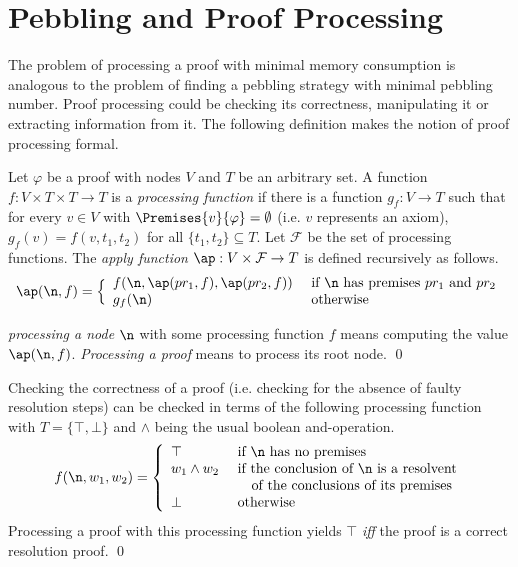 \section{Pebbling and Proof Processing}
\label{sec:pebblingchecking}

The problem of processing a proof with minimal memory consumption is analogous to the problem of finding a pebbling strategy with minimal pebbling number.
Proof processing could be checking its correctness, manipulating it or extracting information from it.
The following definition makes the notion of proof processing formal.

\begin{definition}
\label{def:proof-processing}

Let $\varphi$ be a proof with nodes $V$ and $T$ be an arbitrary set.
A function $f: V \times T \times T \rightarrow T$ is a \emph{processing function} if there is a function $g_f: V \rightarrow T$ such that for every $v \in V$ with $\Premises{v}{\varphi} = \emptyset$ (i.e. $v$ represents an axiom), $g_f(v) = f(v,t_1,t_2)$ for all $\{t_1,t_2\} \subseteq T$.
Let $\mathcal{F}$ be the set of processing functions.
The \emph{apply function} $\ap: V \times \mathcal{F} \rightarrow T$ is defined recursively as follows.
$$
\ap(\n,f) = \Big\{
\begin{array}{ll}
	f(\n,\ap(pr_1,f),\ap(pr_2,f)) &\text{ if } \n \text{ has premises } pr_1 \text{ and } pr_2\\
	g_f(\n) &\text{ otherwise}\\
\end{array}
$$

\emph{processing a node} $\n$ with some processing function $f$ means computing the value $\ap(\n,f)$.
\emph{Processing a proof} means to process its root node.
\qed
\end{definition}

\begin{example}

Checking the correctness of a proof (i.e. checking for the absence of faulty resolution steps) can be checked in terms of the following processing function with $T = \{\top,\bot\}$ and $\wedge$ being the usual boolean and-operation.
$$
f(\n,w_1,w_2) = \left\{
\begin{array}{ll}
	\top & \text{ if $\n$ has no premises} \\
	w_1 \wedge w_2 &\text{ if the conclusion of $\n$ is a resolvent}\\
								 &\quad \text{ of the conclusions of its premises} \\
	\bot & \text{ otherwise}
\end{array}
\right.
$$
Processing a proof with this processing function yields $\top$ \emph{iff} the proof is a correct resolution proof.
\qed
\end{example}


